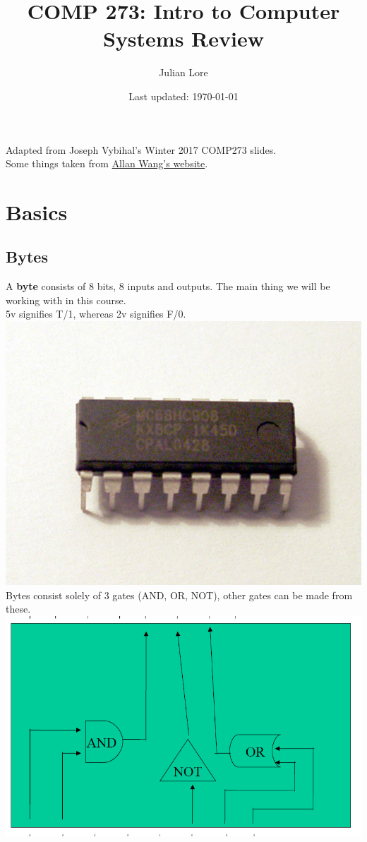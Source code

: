 \documentclass[12 pt]{article}
\author{Julian Lore}
\date{Last updated: \today}
\title{COMP 273: Intro to Computer Systems Review}
\begin{document}
	\onehalfspacing
	\maketitle
	Adapted from Joseph Vybihal's Winter 2017 COMP273 slides.
	\\ Some things taken from \href{https://www.allanwang.ca/}{Allan Wang's website}.
	\tableofcontents
	\newpage
	\section{Basics}
	\subsection{Bytes}
	A \textbf{byte} consists of 8 bits, 8 inputs and outputs. The main thing we will be working with in this course.
	\\ 5v signifies T/1, whereas 2v signifies F/0.
	\includegraphics[scale=0.1]{byte.png}
	\\ Bytes consist solely of 3 gates (AND, OR, NOT), other gates can be made from these. \includegraphics[scale=0.3]{gates.png}
\end{document}

